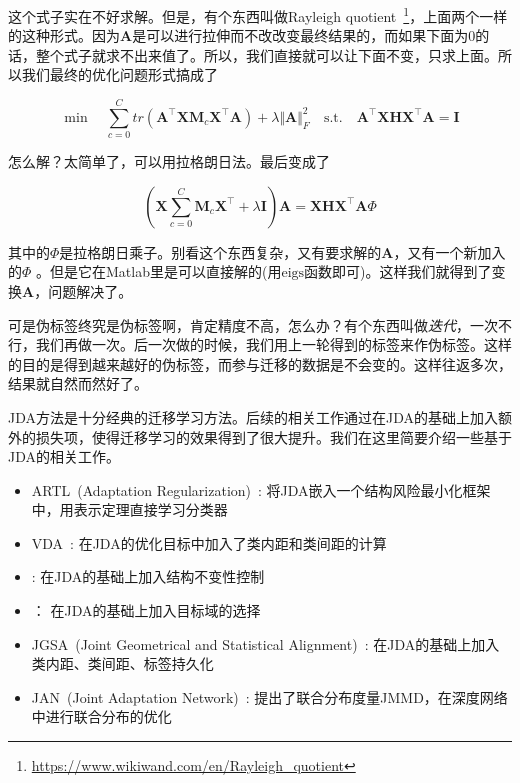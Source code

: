 这个式子实在不好求解。但是，有个东西叫做Rayleigh quotient~\footnote{\url{https://www.wikiwand.com/en/Rayleigh_quotient}}，上面两个一样的这种形式。因为$\mathbf{A}$是可以进行拉伸而不改改变最终结果的，而如果下面为0的话，整个式子就求不出来值了。所以，我们直接就可以让下面不变，只求上面。所以我们最终的优化问题形式搞成了

\begin{equation}
	\min \quad \sum_{c=0}^{C}tr(\mathbf{A}^\top \mathbf{X} \mathbf{M}_c \mathbf{X}^\top \mathbf{A}) + \lambda \Vert \mathbf{A} \Vert ^2_F \quad \text{s.t.} \quad \mathbf{A}^\top \mathbf{X} \mathbf{H} \mathbf{X}^\top \mathbf{A} = \mathbf{I}
\end{equation}

怎么解？太简单了，可以用拉格朗日法。最后变成了

\begin{equation}
	\left(\mathbf{X} \sum_{c=0}^{C} \mathbf{M}_c \mathbf{X}^\top + \lambda \mathbf{I}\right) \mathbf{A} =\mathbf{X} \mathbf{H} \mathbf{X}^\top \mathbf{A} \Phi 
\end{equation}

其中的$\Phi$是拉格朗日乘子。别看这个东西复杂，又有要求解的$\mathbf{A}$，又有一个新加入的$\Phi$ 。但是它在Matlab里是可以直接解的(用$\mathrm{eigs}$函数即可)。这样我们就得到了变换$\mathbf{A}$，问题解决了。

可是伪标签终究是伪标签啊，肯定精度不高，怎么办？有个东西叫做\textit{迭代}，一次不行，我们再做一次。后一次做的时候，我们用上一轮得到的标签来作伪标签。这样的目的是得到越来越好的伪标签，而参与迁移的数据是不会变的。这样往返多次，结果就自然而然好了。

JDA方法是十分经典的迁移学习方法。后续的相关工作通过在JDA的基础上加入额外的损失项，使得迁移学习的效果得到了很大提升。我们在这里简要介绍一些基于JDA的相关工作。

\begin{itemize}
	\item ARTL~(Adaptation Regularization)~\cite{long2014adaptation}: 将JDA嵌入一个结构风险最小化框架中，用表示定理直接学习分类器
	\item VDA~\cite{tahmoresnezhad2016visual}: 在JDA的优化目标中加入了类内距和类间距的计算
	\item \cite{hsiao2016learning}: 在JDA的基础上加入结构不变性控制
	\item \cite{hou2015unsupervised}： 在JDA的基础上加入目标域的选择
	\item JGSA~(Joint Geometrical and Statistical Alignment)~\cite{zhang2017joint}: 在JDA的基础上加入类内距、类间距、标签持久化
	\item JAN~(Joint Adaptation Network)~\cite{long2017deep}: 提出了联合分布度量JMMD，在深度网络中进行联合分布的优化
\end{itemize}

